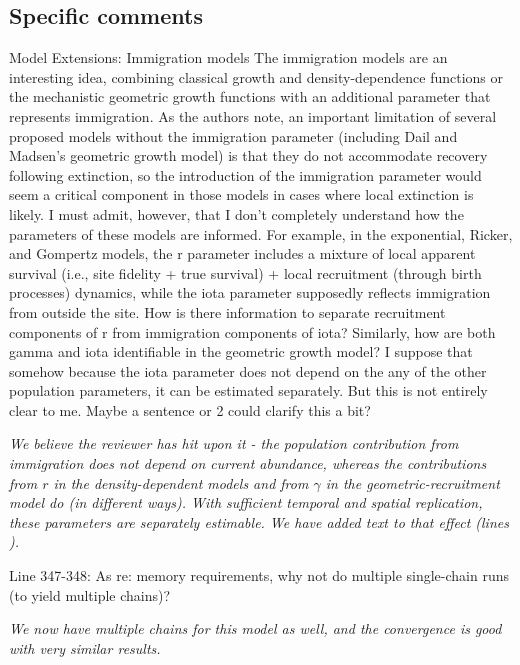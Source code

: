 \documentclass[12pt,english]{article}
\begin{document}
\begin{spacing}{1.9}
\begin{flushleft}
\subsection*{Specific comments} 
Model Extensions: Immigration models 
The immigration models are an interesting idea, combining classical growth and
density-dependence functions or the mechanistic geometric growth functions with
an additional parameter that represents immigration. As the authors note, an
important limitation of several proposed models without the immigration
parameter (including Dail and Madsen's geometric growth model) is that they do
not accommodate recovery following extinction, so the introduction of the
immigration parameter would seem a critical component in those models in cases
where local extinction is likely. I must admit, however, that I don't completely
understand how the parameters of these models are informed. For example, in the
exponential, Ricker, and Gompertz models, the r parameter includes a mixture of
local apparent survival (i.e., site fidelity + true survival) + local
recruitment (through birth processes) dynamics, while the iota parameter
supposedly reflects immigration from outside the site. How is there
information to separate recruitment components of r from immigration components
of iota? Similarly, how are both gamma and iota identifiable in the geometric
growth model? I suppose that somehow because the iota parameter does not depend
on the any of the other population parameters, it can be estimated separately.
But this is not entirely clear to me. Maybe a sentence or 2 could clarify this a
bit?

\vspace{0.5cm}
\textit{We believe the reviewer has hit upon it - the population contribution from immigration
does not depend on current abundance, whereas the contributions from $r$ in the density-dependent
models and from $\gamma$ in the geometric-recruitment model do (in different ways).  With sufficient
temporal and spatial replication, these parameters are separately estimable.  We have added text to that
effect (lines ).}
\vspace{0.5cm}

Line 347-348: As re: memory requirements, why not do multiple single-chain runs
(to yield multiple chains)?

\vspace{0.5cm}
\textit{We now have multiple chains for this model as well, and the convergence is good
with very similar results.}
\vspace{0.5cm}


\end{flushleft}
\end{spacing}
\end{document}
